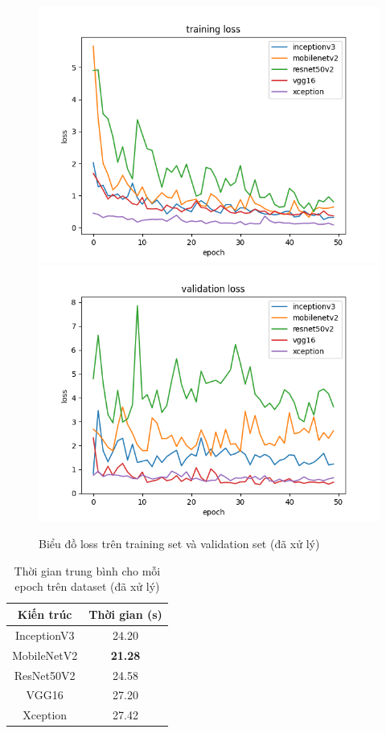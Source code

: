 \documentclass[a4paper,14pt]{extarticle}
\begin{document}
		\begin{figure}[H]
			\centering
			\includegraphics[scale=0.45]{images/loss.png}
			\includegraphics[scale=0.45]{images/val_loss.png}
			\caption{Biểu đồ loss trên training set và validation set (đã xử lý)}
		\end{figure}

		\begin{table}[H]
			\centering
			\begin{tabular}{|c|c|}
			\hline
			Kiến trúc   & Thời gian (s)  \\ \hline
			InceptionV3 & 24.20          \\
			MobileNetV2 & \textbf{21.28} \\
			ResNet50V2  & 24.58          \\
			VGG16       & 27.20          \\
			Xception    & 27.42          \\ \hline
			\end{tabular}
			\caption{Thời gian trung bình cho mỗi epoch trên dataset (đã xử lý)}
		\end{table}
		
\end{document}
